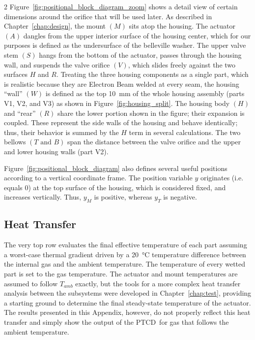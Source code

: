 \documentclass[12pt, letterpaper]{report}%
\newcounter{mycounter}           %
\newcounter{sub}[mycounter]      %
\newcommand{\device}{PTCD}
\begin{document}
\begin{appendices}
\begin{multicols}{2}
			Figure~\ref{fig:positional_block_diagram_zoom} shows a detail view of certain dimensions around the orifice that will be used later.
			As described in Chapter~\ref{chap:design}, the mount $(M)$ sits atop the housing.
			The actuator $(A)$ dangles from the upper interior surface of the housing center, which for our purposes is defined as the undersurface of the belleville washer.
			The upper valve stem $(S)$ hangs from the bottom of the actuator, passes through the housing wall, and suspends the valve orifice $(V)$, which slides freely against the two surfaces $H$ and $R$.
			Treating the three housing components as a single part, which is realistic because they are Electron Beam welded at every seam, the housing ``wall'' $(W)$ is defined as the top \SI{10}{\milli\meter} of the whole housing assembly (parts V1, V2, and V3) as shown in Figure~\ref{fig:housing_split}.
			The housing body $(H)$ and ``rear'' $(R)$ share the lower portion shown in the figure; their expansion is coupled.
			These represent the side walls of the housing and behave identically; thus, their behavior is summed by the $H$ term in several calculations.
			The two bellows $(T \text{ and } B)$ span the distance between the valve orifice and the upper and lower housing walls (part V2).
			
			Figure~\ref{fig:positional_block_diagram} also defines several useful positions according to a vertical coordinate frame. The position variable $y$ originates (i.e. equals $0$) at the top surface of the housing, which is considered fixed, and increases vertically.
			Thus, $y_M$ is positive, whereas $y_T$ is negative.
		\end{multicols}

		\subsection{Heat Transfer}
		\label{app:sat:TF:dT}

			The very top row evaluates the final effective temperature of each part assuming a worst-case thermal gradient driven by a \SI{20}{\degreeCelsius} temperature difference between the internal gas
			and the ambient temperature. The temperature of every wetted part is set to the gas temperature. The actuator and mount temperatures are assumed to follow $T_{amb}$ exactly, but the tools for a more complex
			heat transfer analysis between the subsystems were developed in Chapter~\ref{chap:test}, providing a starting ground to determine the final steady-state temperature of the actuator.
			The results presented in this Appendix, however, do not properly reflect this heat transfer and simply show the output of the \device\ for gas that follows the ambient temperature.
		

\end{appendices}
\end{document}
